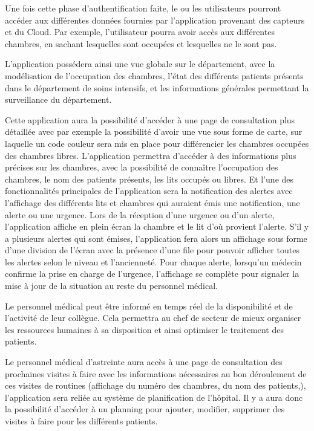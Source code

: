 Une fois cette phase d’authentification faite, le ou les utilisateurs pourront accéder aux différentes données fournies par l’application provenant des capteurs et du Cloud. Par exemple, l’utilisateur pourra avoir accès aux différentes chambres, en sachant lesquelles sont occupées et lesquelles ne le sont pas.


L’application possédera ainsi une vue globale sur le département, avec la modélisation de l’occupation des chambres, l’état des différents patients présents dans le département de soins intensifs, et les informations générales permettant la surveillance du département.

Cette application aura la possibilité d’accéder à une page de consultation plus détaillée avec par exemple la possibilité d’avoir une vue sous forme de carte, sur laquelle un code couleur sera mis en place pour différencier les chambres occupées des chambres libres. L’application permettra d’accéder à des informations plus précises sur les chambres, avec la possibilité de connaître l’occupation des chambres, le nom des patients présents, les lits occupés ou libres. Et l’une des fonctionnalités principales de l’application sera la notification des alertes avec l’affichage des différents lits et chambres qui auraient émis une notification, une alerte ou une urgence. Lors de la réception d’une urgence ou d’un alerte, l’application affiche en plein écran la chambre et le lit d’où provient l’alerte. S’il y a plusieurs alertes qui sont émises, l’application fera alors un affichage sous forme d’une division de l’écran avec la présence d’une file pour pouvoir afficher toutes les alertes selon le niveau et l’ancienneté. Pour chaque alerte, lorsqu’un médecin confirme la prise en charge de l’urgence, l’affichage se complète pour signaler la mise à jour de la situation au reste du personnel médical.

Le personnel médical peut être informé en temps réel de la disponibilité et de l’activité de leur collègue. Cela permettra au chef de secteur de mieux organiser les ressources humaines à sa disposition et ainsi optimiser le traitement des patients.

Le personnel médical d’astreinte aura accès à une page de consultation des prochaines visites à faire avec les informations nécessaires au bon déroulement de ces visites de routines (affichage du numéro des chambres, du nom des patients,), l’application sera reliée au système de planification de l’hôpital. Il y a aura donc la possibilité d’accéder à un planning pour ajouter, modifier, supprimer des visites à faire pour les différents patients.
\\

